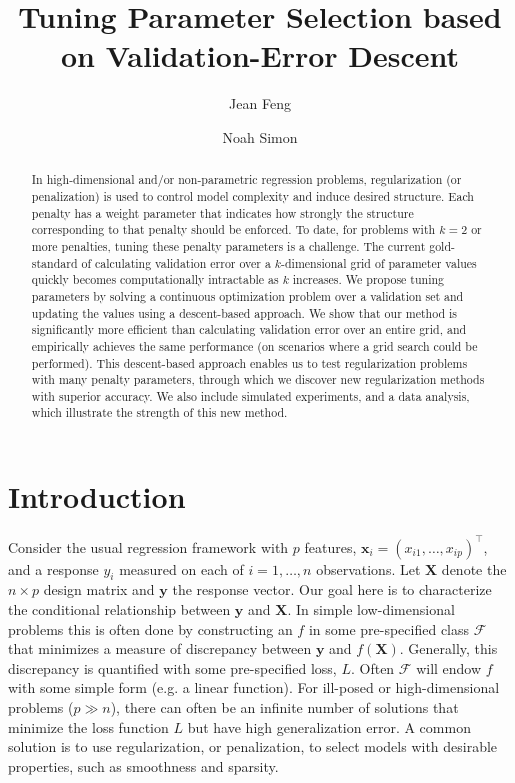 \documentclass{statsoc}
\title[Tuning Parameter Selection]{Tuning Parameter Selection based on Validation-Error Descent}
\author[Author 1]{Jean Feng}
\author{Noah Simon}
\begin{document}
\begin{abstract}
In high-dimensional and/or non-parametric regression problems, regularization (or penalization) is used to control model complexity and induce desired structure. Each penalty has a weight parameter that indicates how strongly the structure corresponding to that penalty should be enforced. To date, for problems with $k=2$ or more penalties, tuning these penalty parameters is a challenge. The current gold-standard of calculating validation error over a $k$-dimensional grid of parameter values quickly becomes computationally intractable as $k$ increases. We propose tuning parameters by solving a continuous optimization problem over a validation set and updating the values using a descent-based approach. We show that our method is significantly more efficient than calculating validation error over an entire grid, and empirically achieves the same performance (on scenarios where a grid search could be performed). This descent-based approach enables us to test regularization problems with many penalty parameters, through which we discover new regularization methods with superior accuracy. We also include simulated experiments, and a data analysis, which illustrate the strength of this new method.
\end{abstract}


\section{Introduction}
Consider the usual regression framework with $p$ features, $\boldsymbol x_i = (x_{i1},\ldots,x_{ip})^\top$, and a response $y_i$ measured on each of $i=1,\ldots,n$ observations. Let $\boldsymbol X$ denote the $n \times p$ design matrix and $\boldsymbol y$ the response vector. Our goal here is to characterize the conditional relationship between $\boldsymbol y$ and $\boldsymbol X$. In simple low-dimensional problems this is often done by constructing an $f$ in some pre-specified class $\mathcal{F}$ that minimizes a measure of discrepancy between $\boldsymbol y$ and $f(\boldsymbol X)$. Generally, this discrepancy is quantified with some pre-specified loss, $L$. Often $\mathcal{F}$ will endow $f$ with some simple form (e.g. a linear function). For ill-posed or high-dimensional problems ($p \gg n$), there can often be an infinite number of solutions that minimize the loss function $L$ but have high generalization error. A common solution is to use regularization, or penalization, to select models with desirable properties, such as smoothness and sparsity.
\end{document}
